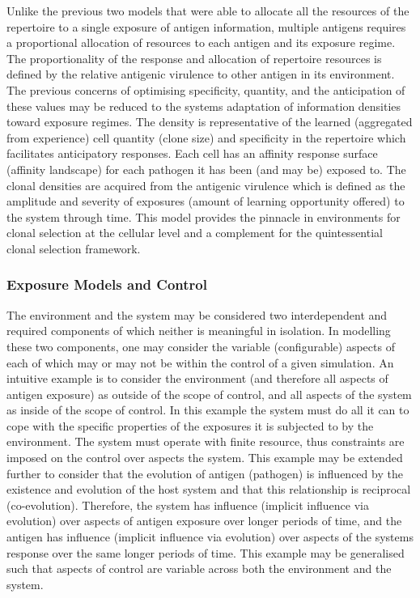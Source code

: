 Unlike the previous two models that were able to allocate all the resources of the repertoire to a single exposure of antigen information, multiple antigens requires a proportional allocation of resources to each antigen and its exposure regime. The proportionality of the response and allocation of repertoire resources is defined by the relative antigenic virulence to other antigen in its environment. The previous concerns of optimising specificity, quantity, and the anticipation of these values may be reduced to the systems adaptation of information densities toward exposure regimes. The density is representative of the learned (aggregated from experience) cell quantity (clone size) and specificity in the repertoire which facilitates anticipatory responses. Each cell has an affinity response surface (affinity landscape) for each pathogen it has been (and may be) exposed to. The clonal densities are acquired from the antigenic virulence which is defined as the amplitude and severity of exposures (amount of learning opportunity offered) to the system through time. This model provides the pinnacle in environments for clonal selection at the cellular level and a complement for the quintessential clonal selection framework.

%
%
\subsubsection{Exposure Models and Control}
The environment and the system may be considered two interdependent and required components of which neither is meaningful in isolation. In modelling these two components, one may consider the variable (configurable) aspects of each of which may or may not be within the control of a given simulation. 
An intuitive example is to consider the environment (and therefore all aspects of antigen exposure) as outside of the scope of control, and all aspects of the system as inside of the scope of control. In this example the system must do all it can to cope with the specific properties of the exposures it is subjected to by the environment. The system must operate with finite resource, thus constraints are imposed on the control over aspects the system. This example may be extended further to consider that the evolution of antigen (pathogen) is influenced by the existence and evolution of the host system and that this relationship is reciprocal (co-evolution). Therefore, the system has influence (implicit influence via evolution) over aspects of antigen exposure over longer periods of time, and the antigen has influence (implicit influence via evolution) over aspects of the systems response over the same longer periods of time. This example may be generalised such that aspects of control are variable across both the environment and the system. 

